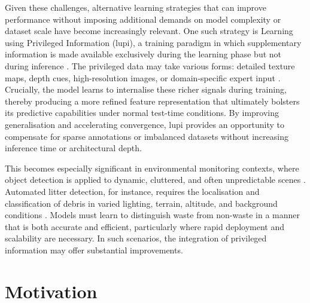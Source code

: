 Given these challenges, alternative learning strategies that can improve performance without imposing additional demands on model complexity or dataset scale have become increasingly relevant. One such strategy is Learning using Privileged Information (\gls{lupi}), a training paradigm in which supplementary information is made available exclusively during the learning phase but not during inference \cite{lupi}. The privileged data may take various forms: detailed texture maps, depth cues, high-resolution images, or domain-specific expert input \cite{lupi, lupi_classification, lupiv3}. Crucially, the model learns to internalise these richer signals during training, thereby producing a more refined feature representation that ultimately bolsters its predictive capabilities under normal test-time conditions. By improving generalisation and accelerating convergence, \gls{lupi} provides an opportunity to compensate for sparse annotations or imbalanced datasets without increasing inference time or architectural depth.

This becomes especially significant in environmental monitoring contexts, where object detection is applied to dynamic, cluttered, and often unpredictable scenes \cite{soda_dataset, bdwdataset}. Automated litter detection, for instance, requires the localisation and classification of debris in varied lighting, terrain, altitude, and background conditions \cite{soda_dataset, taco2020}. Models must learn to distinguish waste from non-waste in a manner that is both accurate and efficient, particularly where rapid deployment and scalability are necessary. In such scenarios, the integration of privileged information may offer substantial improvements.

\section{Motivation}
\label{sec:motivation}

